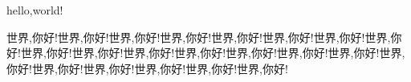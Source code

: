 \documentclass[11pt,a4paper]{article}
\begin{document}
hello,world!

世界,你好!世界,你好!世界,你好!世界,你好!世界,你好!世界,你好!世界,你好!世界,你好!世界,你好!世界,你好!世界,你好!世界,你好!世界,你好!世界,你好!世界,你好!世界,你好!世界,你好!世界,你好!世界,你好!世界,你好!世界,你好!
\end{document}

